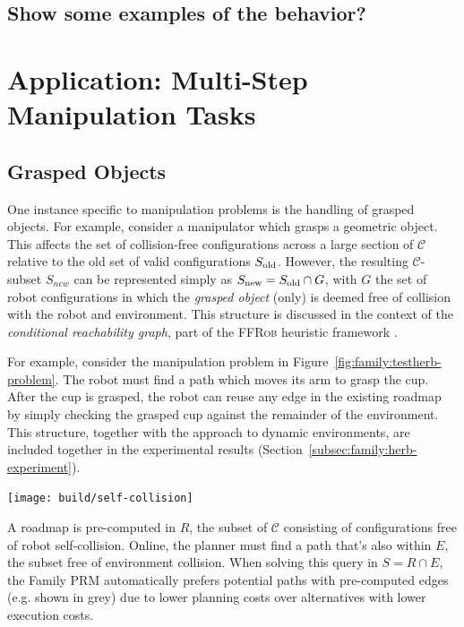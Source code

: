 \subsection{Show some examples of the behavior?}




\section{Application: Multi-Step Manipulation Tasks}
\label{subsec:family:app-multi-step}

\subsection{Grasped Objects}
\label{subsec:family:grasped-objects}

One instance specific to manipulation problems is the handling of
grasped objects.
For example, 
consider a manipulator which grasps a geometric object.
This affects the set of collision-free configurations
across a large section of $\mathcal{C}$
relative to the old set of valid configurations $S_{\mbox{\scriptsize old}}$.
However,
the resulting $\mathcal{C}$-subset $S_{new}$
can be represented simply as
$S_{\mbox{\scriptsize new}} = S_{\mbox{\scriptsize old}} \cap G$,
with $G$ the set of robot configurations in which
the \emph{grasped object} (only)
is deemed free of collision with the robot and environment.
This structure is discussed in the context of the
\emph{conditional reachability graph},
part of the \textsc{FFRob} heuristic framework
\citep{garrett2014ffrob}.

For example,
consider the manipulation problem in
Figure~\ref{fig:family:testherb-problem}.
The robot must find a path which moves its arm to grasp the cup.
After the cup is grasped,
the robot can reuse any edge in the existing roadmap
by simply checking the grasped cup
against the remainder of the environment.
This structure,
together with the approach to dynamic environments,
are included together in the experimental results
(Section~\ref{subsec:family:herb-experiment}).

\begin{marginfigure}
   \centering
   \texttt{[image: build/self-collision]}
   \caption{A roadmap is pre-computed in $R$,
      the subset of $\mathcal{C}$ consisting of configurations free
      of robot self-collision.
      Online, the planner must find a path that's also within $E$,
      the subset free of environment collision.
      When solving this query in $S = R \cap E$,
      the Family PRM automatically prefers potential paths with
      pre-computed edges (e.g. shown in grey)
      due to lower planning costs over alternatives with lower
      execution costs.}
   \label{fig:family:self-collision-example}
\end{marginfigure}

